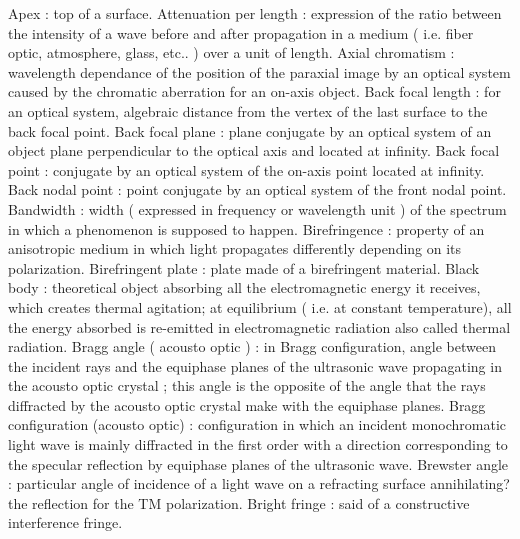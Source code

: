 Apex                                                 : top of a surface.
Attenuation per length                               : expression of the ratio between the intensity of a wave before and after propagation in a medium ( i.e. fiber optic, atmosphere, glass, etc.. ) over a unit of length.
Axial chromatism                                     : wavelength dependance of the position of the paraxial image by an optical system caused by the chromatic aberration for an on-axis object.
Back focal length                                    : for an optical system, algebraic distance from the vertex of the last surface to the back focal point.
Back focal plane                                     : plane conjugate by an optical system of an object plane perpendicular to the optical axis and located at infinity.
Back focal point                                     : conjugate by an optical system of the on-axis point located at infinity.
Back nodal point                                     : point conjugate by an optical system of the front nodal point.
Bandwidth                                            : width ( expressed in frequency or wavelength unit ) of the spectrum in which a phenomenon is supposed to happen.
Birefringence                                        : property of an anisotropic medium in which light propagates differently depending on its polarization.
Birefringent plate                                   : plate made of a birefringent material.
Black body                                           : theoretical object absorbing all the electromagnetic energy it receives, which creates thermal agitation; at equilibrium ( i.e. at constant temperature), all the energy absorbed is re-emitted in electromagnetic radiation also called thermal radiation.
Bragg angle ( acousto optic )                        : in Bragg configuration, angle between the incident rays and the equiphase planes of the ultrasonic wave propagating in the acousto optic crystal ; this angle is the opposite of the angle that the rays diffracted by the acousto optic crystal make with the equiphase planes.
Bragg configuration (acousto optic)                  : configuration in which an incident monochromatic light wave is mainly diffracted in the first order with a direction corresponding to the specular reflection by equiphase planes of the ultrasonic wave.
Brewster angle                                       : particular angle of incidence of a light wave on a refracting surface annihilating? the reflection for the TM polarization.
Bright fringe                                        : said of a constructive interference fringe.
